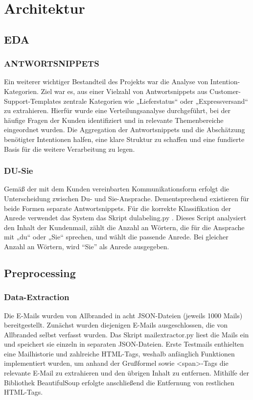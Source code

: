 \chapter{Architektur}


\section{EDA}

\subsection{ANTWORTSNIPPETS}

Ein weiterer wichtiger Bestandteil des Projekts war die Analyse von
Intention-Kategorien. Ziel war es, aus einer Vielzahl von Antwortsnippets
aus Customer-Support-Templates zentrale Kategorien wie „Lieferstatus“ oder
„Expressversand“ zu extrahieren. Hierfür wurde eine Verteilungsanalyse durchgeführt,
bei der häufige Fragen der Kunden identifiziert und in relevante Themenbereiche
eingeordnet wurden. Die Aggregation der Antwortsnippets und die Abschätzung
benötigter Intentionen halfen, eine klare Struktur zu schaffen und eine fundierte
Basis für die weitere Verarbeitung zu legen. 

\subsection{DU-Sie}

Gemäß der mit dem Kunden vereinbarten Kommunikationsform erfolgt die Unterscheidung
zwischen Du- und Sie-Ansprache. Dementsprechend existieren für beide Formen separate
Antwortsnippets. Für die korrekte Klassifikation der Anrede verwendet das System das
Skript du\textunderscore labeling.py . Dieses Script analysiert den Inhalt der Kundenmail,
zählt die Anzahl an Wörtern, die für die Ansprache mit „du“ oder „Sie“ sprechen, und wählt
die passende Anrede. Bei gleicher Anzahl an Wörtern, wird “Sie” als Anrede ausgegeben. 

\section{Preprocessing}

\subsection{Data-Extraction}

Die E-Mails wurden von Allbranded in acht JSON-Dateien (jeweils 1000 Mails) bereitgestellt.
Zunächst wurden diejenigen E-Mails ausgeschlossen, die von Allbranded selbst verfasst
wurden. Das Skript mail\textunderscore extractor.py liest die Mails ein und speichert sie einzeln in
separaten JSON-Dateien. Erste Testmails enthielten eine Mailhistorie und zahlreiche
HTML-Tags, weshalb anfänglich Funktionen implementiert wurden, um anhand der Grußformel
sowie <span>-Tags die relevante E-Mail zu extrahieren und den übrigen Inhalt zu entfernen.
Mithilfe der Bibliothek BeautifulSoup erfolgte anschließend die Entfernung von restlichen
HTML-Tags. 

